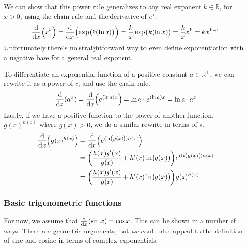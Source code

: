\documentclass[fleqn,a4paper,11pt]{article}
\newcommand{\setstyle}{\mathbb}
\newcommand{\Reals}{\setstyle R}
\begin{document}
    We can show that this power rule generalizes to any real exponent \(k \in
    \Reals\), for \(x > 0\), using the chain rule and the derivative of \(e^x\).
    \begin{equation*}
    \dv{x}(x^k) = \dv{x}(\exp(k(\ln x))) = \frac kx \exp(k(\ln x))
        = \frac kx x^k = k x^{k - 1}
    \end{equation*}
    Unfortunately there's no straightforward way to even define exponentiation
    with a negative base for a general real exponent.

    To differentiate an exponential function of a positive constant
    \(a \in \Reals^+\), we can rewrite it as a power of \(e\), and use the chain
    rule.
    \begin{equation*}
    \dv{x}(a^x) = \dv{x}(e^{(\ln a)x}) = \ln a \cdot e^{(\ln a)x}
        = \ln a \cdot a^x
    \end{equation*}
    Lastly, if we have a positive function to the power of another function,
    \(g(x)^{h(x)}\) where \(g(x) > 0\), we do a similar rewrite in terms of
    \(e\).
    \begin{align*}
    \dv{x}(g(x)^{h(x)}) &= \dv{x}(e^{(\ln(g(x)))h(x)}) \\
        &= \pqty{\frac{h(x)g'(x)}{g(x)} + h'(x)\ln(g(x))}e^{(\ln(g(x)))h(x)} \\
        &= \pqty{\frac{h(x)g'(x)}{g(x)} + h'(x)\ln(g(x))}g(x)^{h(x)}
    \end{align*}

    \subsubsection{Basic trigonometric functions} \label{sec_calc_trig_basic}


    For now, we assume that \(\dv{x}(\sin x) = \cos x\). This can
    be shown in a number of ways. There are geometric arguments, but we could
    also appeal to the definition of sine and cosine in terms of complex
    exponentials.
\end{document}
